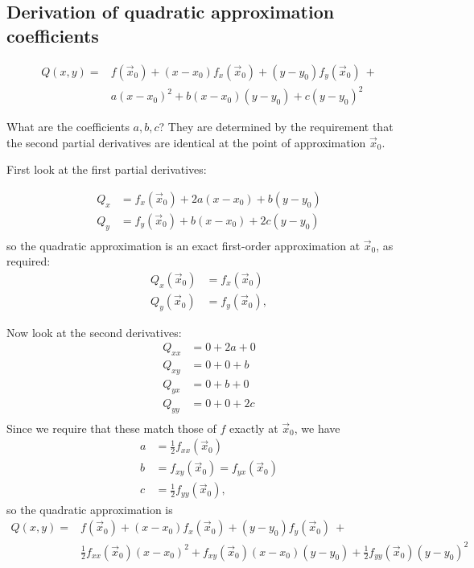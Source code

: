 \subsection{Derivation of quadratic approximation coefficients}
\begin{align*}
Q(x, y) =
&f(\vec x_0) + (x - x_0)f_x(\vec x_0) +
(y - y_0)f_y(\vec x_0) ~+ \\
&a(x - x_0)^2 +
b(x - x_0)(y - y_0) +
c(y - y_0)^2
\end{align*}

What are the coefficients $a,b,c$? They are determined by the requirement that
the second partial derivatives are identical at the point of approximation
$\vec x_0$.

First look at the first partial derivatives:

\begin{align*}
  Q_x &= f_x(\vec x_0) + 2a(x - x_0) + b(y - y_0)\\
  Q_y &= f_y(\vec x_0) + b(x - x_0) + 2c(y - y_0)\\
\end{align*}
so the quadratic approximation is an exact first-order approximation at $\vec x_0$, as required:
\begin{align*}
  Q_x(\vec x_0) &= f_x(\vec x_0) \\
  Q_y(\vec x_0) &= f_y(\vec x_0),
\end{align*}

Now look at the second derivatives:
\begin{align*}
  Q_{xx} &= 0 + 2a + 0 \\
  Q_{xy} &= 0 + 0 + b \\
  Q_{yx} &= 0 + b + 0 \\
  Q_{yy} &= 0 + 0 + 2c \\
\end{align*}
Since we require that these match those of $f$ exactly at $\vec x_0$, we have
\begin{align*}
  a &= \frac{1}{2} f_{xx}(\vec x_0) \\
  b &= f_{xy}(\vec x_0) = f_{yx}(\vec x_0) \\
  c &= \frac{1}{2} f_{yy}(\vec x_0),
\end{align*}
so the quadratic approximation is
\begin{align*}
Q(x, y) =
&f(\vec x_0) + (x - x_0)f_x(\vec x_0) +
(y - y_0)f_y(\vec x_0) ~+ \\
&\frac{1}{2} f_{xx}(\vec x_0)(x - x_0)^2 +
f_{xy}(\vec x_0)(x - x_0)(y - y_0) +
\frac{1}{2} f_{yy}(\vec x_0)(y - y_0)^2
\end{align*}

